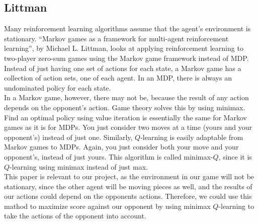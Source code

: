 \documentclass[letterpaper]{article}
\begin{document}
\subsection{Littman}
Many reinforcement learning algorithms assume that the agent's environment is stationary. ``Markov games as a framework for multi-agent reinforcement learning'', by Michael L. Littman, looks at applying reinforcement learning to two-player zero-sum games using the Markov game framework instead of MDP. Instead of just having one set of actions for each state, a Markov game has a collection of action sets, one of each agent. In an MDP, there is always an undominated policy for each state. \\

In a Markov game, however, there may not be, because the result of any action depends on the opponent's action. Game theory solves this by using minimax. Find an optimal policy using value iteration is essentially the same for Markov games as it is for MDPs. You just consider two moves at a time (yours and your opponent's) instead of just one. Similarly, $Q$-learning is easily adaptable from Markov games to MDPs. Again, you just consider both your move and your opponent's, instead of just yours. This algorithm is called minimax-$Q$, since it is $Q$-learning using minimax instead of just max.\\

This paper is relevant to our project, as the environment in our game will not be stationary, since the other agent will be moving pieces as well, and the results of our actions could depend on the opponents actions. Therefore, we could use this mathod to maximize score against our opponent by using minimax $Q$-learning to take the actions of the opponent into account.
\\
\end{document}
